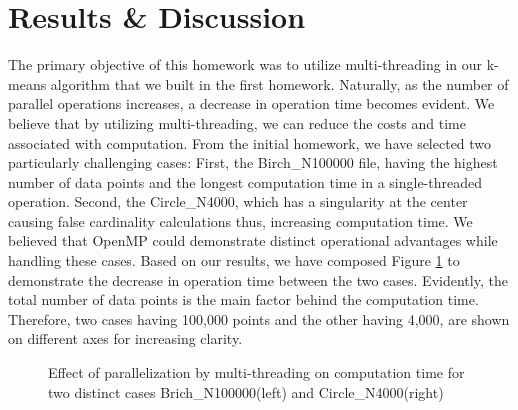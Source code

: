\documentclass{article}
\begin{document}
 \section{Results \& Discussion}
The primary objective of this homework was to utilize multi-threading in our k-means algorithm that we built in the first homework. Naturally, as the number of parallel operations increases, a decrease in operation time becomes evident. We believe that by utilizing multi-threading, we can reduce the costs and time associated with computation. From the initial homework, we have selected two particularly challenging cases: First, the Birch\_N100000 file, having the highest number of data points and the longest computation time in a single-threaded operation. Second, the Circle\_N4000, which has a singularity at the center causing false cardinality calculations thus, increasing computation time. We believed that OpenMP could demonstrate distinct operational advantages while handling these cases. Based on our results, we have composed Figure \ref{fig1} to demonstrate the decrease in operation time between the two cases. Evidently, the total number of data points is the main factor behind the computation time. Therefore, two cases having 100,000 points and the other having 4,000, are shown on different axes for increasing clarity.



\begin{figure} [htbp]
    \centering
    \caption{Effect of parallelization by multi-threading on computation time for two distinct cases Brich\_N100000(left) and Circle\_N4000(right)}
    \label{fig1}
\end{figure}
\end{document}
